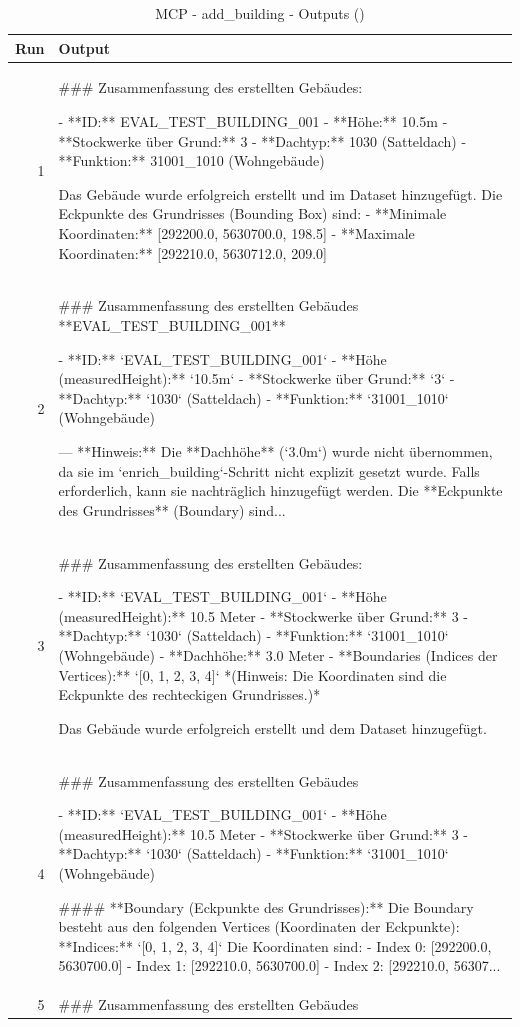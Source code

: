 \documentclass[a4paper,11pt]{article}
\begin{document}
\begin{table}[ht]
\centering
\scriptsize
\caption{MCP - add\_building - Outputs ()}
\label{tab:mcp\_add\_building\_outputs\_}
\begin{tabular}{r p{12cm}}
\hline
Run & Output \\
\hline
1 & \#\#\# Zusammenfassung des erstellten Gebäudes:

- **ID:** EVAL\_TEST\_BUILDING\_001
- **Höhe:** 10.5m
- **Stockwerke über Grund:** 3
- **Dachtyp:** 1030 (Satteldach)
- **Funktion:** 31001\_1010 (Wohngebäude)

Das Gebäude wurde erfolgreich erstellt und im Dataset hinzugefügt. Die Eckpunkte des Grundrisses (Bounding Box) sind:
- **Minimale Koordinaten:** [292200.0, 5630700.0, 198.5]
- **Maximale Koordinaten:** [292210.0, 5630712.0, 209.0] \\
2 & \#\#\# Zusammenfassung des erstellten Gebäudes **EVAL\_TEST\_BUILDING\_001**

- **ID:** `EVAL\_TEST\_BUILDING\_001`
- **Höhe (measuredHeight):** `10.5m`
- **Stockwerke über Grund:** `3`
- **Dachtyp:** `1030` (Satteldach)
- **Funktion:** `31001\_1010` (Wohngebäude)

---
**Hinweis:**
Die **Dachhöhe** (`3.0m`) wurde nicht übernommen, da sie im `enrich\_building`-Schritt nicht explizit gesetzt wurde. Falls erforderlich, kann sie nachträglich hinzugefügt werden.
Die **Eckpunkte des Grundrisses** (Boundary) sind... \\
3 & \#\#\# Zusammenfassung des erstellten Gebäudes:

- **ID:** `EVAL\_TEST\_BUILDING\_001`
- **Höhe (measuredHeight):** 10.5 Meter
- **Stockwerke über Grund:** 3
- **Dachtyp:** `1030` (Satteldach)
- **Funktion:** `31001\_1010` (Wohngebäude)
- **Dachhöhe:** 3.0 Meter
- **Boundaries (Indices der Vertices):** `[0, 1, 2, 3, 4]`
  *(Hinweis: Die Koordinaten sind die Eckpunkte des rechteckigen Grundrisses.)*

Das Gebäude wurde erfolgreich erstellt und dem Dataset hinzugefügt. 🎉 \\
4 & \#\#\# Zusammenfassung des erstellten Gebäudes

- **ID:** `EVAL\_TEST\_BUILDING\_001`
- **Höhe (measuredHeight):** 10.5 Meter
- **Stockwerke über Grund:** 3
- **Dachtyp:** `1030` (Satteldach)
- **Funktion:** `31001\_1010` (Wohngebäude)

\#\#\#\# **Boundary (Eckpunkte des Grundrisses):**
Die Boundary besteht aus den folgenden Vertices (Koordinaten der Eckpunkte):
**Indices:** `[0, 1, 2, 3, 4]`
Die Koordinaten sind:
- Index 0: [292200.0, 5630700.0]
- Index 1: [292210.0, 5630700.0]
- Index 2: [292210.0, 56307... \\
5 & \#\#\# Zusammenfassung des erstellten Gebäudes


\end{tabular}
\end{table}
\end{document}
